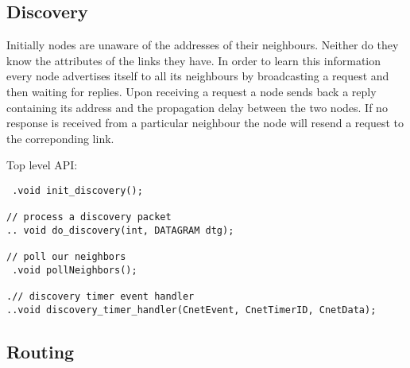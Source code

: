 \documentclass[11pt,a4paper,oneside]{report}
\begin{document}
\subsection*{Discovery}
Initially nodes are unaware of the addresses of their neighbours. Neither do they know the
attributes of the links they have. In order to learn this information every node advertises
itself to all its neighbours by broadcasting a request and then waiting for replies. Upon receiving
a request a node sends back a reply containing its address and the propagation delay between the
two nodes. If no response is received from a particular neighbour the node will resend a request to the
correponding link.

Top level API:
\begin{lstlisting}
 .void init_discovery();

// process a discovery packet
.. void do_discovery(int, DATAGRAM dtg);

// poll our neighbors
 .void pollNeighbors();

.// discovery timer event handler
..void discovery_timer_handler(CnetEvent, CnetTimerID, CnetData);
\end{lstlisting}
\subsection*{Routing}
\end{document}
